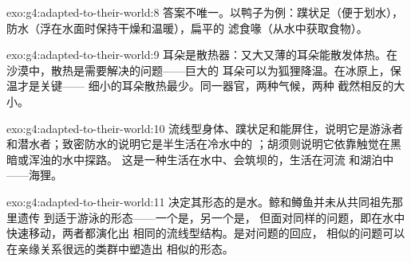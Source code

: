 \begin{solution}{exo:g4:adapted-to-their-world:8}
答案不唯一。以鸭子为例：蹼状足（便于划水），
防水（浮在水面时保持干燥和温暖），扁平的
滤食喙（从水中获取食物）。
\end{solution}

\begin{solution}{exo:g4:adapted-to-their-world:9}
耳朵是散热器：又大又薄的耳朵能散发体热。在
沙漠中，散热是需要解决的问题——巨大的
耳朵可以为狐狸降温。在冰原上，保温才是关键——
细小的耳朵散热最少。同一器官，两种气候，两种
截然相反的大小。
\end{solution}

\begin{solution}{exo:g4:adapted-to-their-world:10}
流线型身体、蹼状足和能屏住，说明它是游泳者
和潜水者；致密防水的说明它是半生活在冷水中的
；胡须则说明它依靠触觉在黑暗或浑浊的水中探路。
这是一种生活在水中、会筑坝的，生活在河流
和湖泊中——海狸。
\end{solution}

\begin{solution}{exo:g4:adapted-to-their-world:11}
决定其形态的是水。鲸和鳟鱼并未从共同祖先那里遗传
到适于游泳的形态——一个是，另一个是，
但面对同样的问题，即在水中快速移动，两者都演化出
相同的流线型结构。是对问题的回应，
相似的问题可以在亲缘关系很远的类群中塑造出
相似的形态。
\end{solution}
